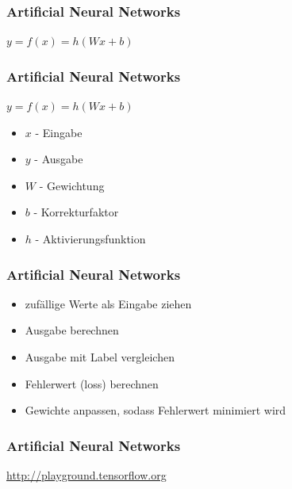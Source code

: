 \documentclass[12pt,utf8]{beamer}
\begin{document}
	\begin{frame}
		\frametitle{Artificial Neural Networks}
		\begin{figure}[h]
			\centering
		\end{figure}
		\centering $y = f(x) = h(Wx + b)$
	\end{frame}
	
	\begin{frame}
		\frametitle{Artificial Neural Networks}
		\begin{center}
			$y = f(x) = h(Wx + b)$
		\end{center}
		\begin{itemize}
			\item $x$ - Eingabe
			\item $y$ - Ausgabe
			\item $W$ - Gewichtung
			\item $b$ - Korrekturfaktor
			\item $h$ - Aktivierungsfunktion
		\end{itemize}
	\end{frame}
	
	\begin{frame}
		\frametitle{Artificial Neural Networks}
		\begin{itemize}
			\item zufällige Werte als Eingabe ziehen
			\item Ausgabe berechnen
			\item Ausgabe mit Label vergleichen
			\item Fehlerwert (loss) berechnen
			\item Gewichte anpassen, sodass Fehlerwert minimiert wird
		\end{itemize}
	\end{frame}
	
	\begin{frame}
		\frametitle{Artificial Neural Networks}
		\centering \url{http://playground.tensorflow.org}
	\end{frame}
	
\end{document}

